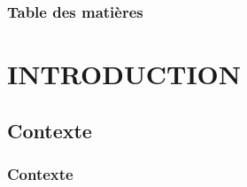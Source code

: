 \documentclass[aspectratio=169,professionalfonts, 12pt]{beamer}
\date{\today}
\begin{document}
\begin{frame}
	\titlepage
\end{frame}
\begin{frame}
	\frametitle{Table des matières}
    \begin{multicols}{2}
    \tableofcontents
    \end{multicols}
\end{frame}

\section{INTRODUCTION}

\subsection{Contexte}


\begin{frame}
  \frametitle{Contexte}
  \justifying
  \begin{minipage}{\textwidth}
    \begin{figure}[H]
      \centering
      \qquad
    \end{figure}
  \end{minipage}
\end{frame}
\end{document}
